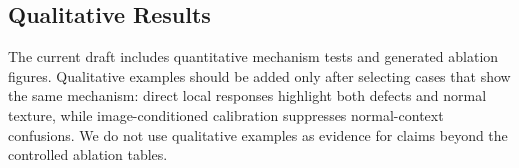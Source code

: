 

\subsection{Qualitative Results}
The current draft includes quantitative mechanism tests and generated ablation
figures. Qualitative examples should be added only after selecting cases that
show the same mechanism: direct local responses highlight both defects and
normal texture, while image-conditioned calibration suppresses normal-context
confusions. We do not use qualitative examples as evidence for claims beyond
the controlled ablation tables.
